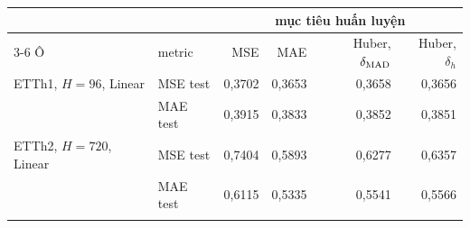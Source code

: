 \begin{tabular}{@{}l l rrrr@{}}
\toprule
 & & \multicolumn{4}{c}{mục tiêu huấn luyện} \\
\cmidrule(l){3-6}
Ô & metric & MSE & MAE & Huber, $\delta_{\mathrm{MAD}}$ & Huber, $\delta_h$ \\
\midrule
ETTh1, $H = 96$, Linear & MSE test & 0{,}3702 & 0{,}3653 & 0{,}3658 & 0{,}3656 \\
 & MAE test & 0{,}3915 & 0{,}3833 & 0{,}3852 & 0{,}3851 \\
\addlinespace[2pt]
ETTh2, $H = 720$, Linear & MSE test & 0{,}7404 & 0{,}5893 & 0{,}6277 & 0{,}6357 \\
 & MAE test & 0{,}6115 & 0{,}5335 & 0{,}5541 & 0{,}5566 \\
\addlinespace[2pt]
\bottomrule
\end{tabular}
